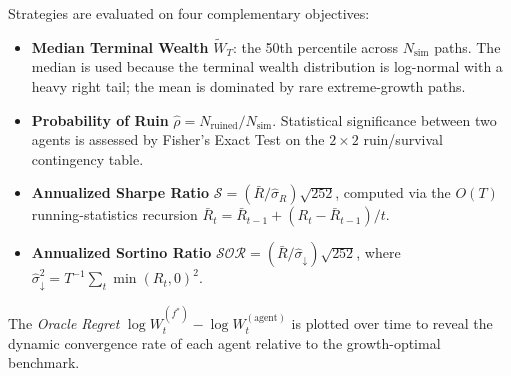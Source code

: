 Strategies are evaluated on four complementary objectives:

\begin{itemize}
    \item \textbf{Median Terminal Wealth} $\tilde W_T$: the 50th percentile
    across $N_{\text{sim}}$ paths.  The median is used because the terminal
    wealth distribution is log-normal with a heavy right tail; the mean is
    dominated by rare extreme-growth paths.

    \item \textbf{Probability of Ruin}
    $\hat\rho = N_{\text{ruined}}/N_{\text{sim}}$.
    Statistical significance between two agents is assessed by Fisher's
    Exact Test on the $2\times 2$ ruin/survival contingency table.

    \item \textbf{Annualized Sharpe Ratio}
    $\mathcal{S} = (\bar R/\hat\sigma_R)\sqrt{252}$,
    computed via the $O(T)$ running-statistics recursion
    $\bar R_t = \bar R_{t-1} + (R_t - \bar R_{t-1})/t$.

    \item \textbf{Annualized Sortino Ratio}
    $\mathcal{SOR} = (\bar R/\hat\sigma_\downarrow)\sqrt{252}$,
    where $\hat\sigma_\downarrow^2 = T^{-1}\sum_t\min(R_t,0)^2$.
\end{itemize}

The \emph{Oracle Regret} $\log W_t^{(f^*)} - \log W_t^{(\text{agent})}$ is
plotted over time to reveal the dynamic convergence rate of each agent
relative to the growth-optimal benchmark.
